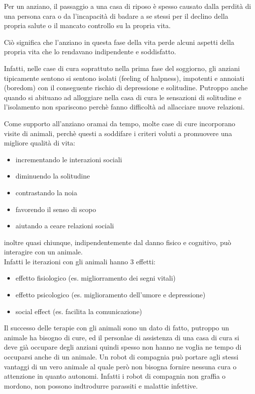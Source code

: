 \documentclass{thesisreport}
\begin{document}
 Per un anziano, il passaggio a una casa di riposo è spesso causato dalla perdità di una persona cara o da l'incapacità di badare a se stessi per il declino della propria salute o il mancato controllo su la propria vita. 
 
 Ciò significa che l'anziano in questa fase della vita perde alcuni aspetti della propria vita che lo rendavano indipendente e soddisfatto. 
 
 Infatti, nelle case di cura soprattuto nella prima fase del soggiorno, gli anziani tipicamente sentono si sentono isolati (feeling of halpness), impotenti e annoiati (boredom) con il conseguente rischio di depressione e solitudine. 
 Putroppo anche quando si abituano ad alloggiare nella casa di cura le sensazioni di solitudine e l'isolamento non spariscono perchè fanno difficoltà ad allacciare nuove relazioni.
 
 Come supporto all'anziano oramai da tempo, molte case di cure incorporano visite di animali, perchè questi a soddifare i criteri voluti a promuovere una migliore qualità di vita:
 \begin{itemize}
     \item incrementando le interazioni sociali
     \item diminuendo la solitudine
     \item contrastando la noia
     \item favorendo il senso di scopo 
     \item aiutando a ceare relazioni sociali
 \end{itemize}
 inoltre quasi chiunque, indipendentemente dal danno fisico e cognitivo, può interagire con un animale.  \\
 Infatti le iterazioni con gli animali hanno 3 effetti: \\
 \begin{itemize}
     \item effetto fisiologico (es. migliorramento dei segni vitali)
     \item effetto psicologico (es. miglioramento dell'umore e depressione)
     \item social effect (es. facilita la comunicazione)
 \end{itemize}

 Il successo delle terapie con gli animali sono un dato di fatto, putroppo un animale ha bisogno di cure, ed il personlae di assistenza di una casa di cura si deve già occupare degli anziani quindi spesso non hanno ne voglia ne tempo di occuparsi anche di un animale. 
 Un robot di compagnia può portare agli stessi vantaggi di un vero animale al quale però non bisogna fornire nessuna cura o attenzione in quanto autonomi.
 Infatti i robot di compagnia non graffia o mordono, non possono indtrodurre parassiti e malattie infettive.
 
\end{document}
